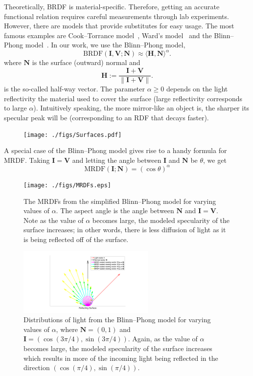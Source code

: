 \documentclass[11pt,reqno]{amsart}
\newcommand{\BRDF}{\mathrm{BRDF}}
\newcommand{\MRDF}{\mathrm{MRDF}}
\newcommand{\ip}[2]{\langle {#1}, {#2} \rangle}
\theoremstyle{definition}
\begin{document}
Theoretically, BRDF is material-specific. Therefore, getting an accurate functional
relation requires careful measurements through lab experiments. However, there
are models that provide substitutes for easy usage. The most famous examples
are Cook--Torrance model~\cite{CookTorr}, Ward's model~\cite{Ward} and the
Blinn--Phong model~\cite{BlinnPhong}. In our 
work, we use the
Blinn--Phong model,
\[
   \BRDF(\mathbf{I},\mathbf{V};\mathbf{N})
   \approx
   \ip{\mathbf{H}}{\mathbf{N}}^\alpha.
\]
where $\mathbf{N}$ is the surface (outward) normal and 
$$\mathbf{H}:=\frac{\mathbf{I}+\mathbf{V}} {\|\mathbf{I}+\mathbf{V}\|}.$$
is the so-called half-way vector. The parameter $\alpha \geq 0$ depends on the
light reflectivity the material used to cover the surface (large reflectivity
corresponds to large $\alpha$). Intuitively speaking, the more mirror-like an
object is,  the sharper its specular peak will be (corresponding to an RDF that
decays faster). 

\begin{figure}
 \texttt{[image: ./figs/Surfaces.pdf]}
\end{figure}

A special case of the Blinn--Phong model gives rise to a handy formula for MRDF. Taking $\mathbf{I}=\mathbf{V}$ and letting the angle between $\mathbf{I}$ and $\mathbf{N}$ be $\theta$, we get
\[
\MRDF(\mathbf{I};\mathbf{N})=(\cos \theta)^\alpha
\]

\begin{figure}
 \texttt{[image: ./figs/MRDFs.eps]}
 \caption{The MRDFs from the simplified Blinn--Phong model for varying values of $\alpha$. The aspect angle is the angle between $\mathbf{N}$ and $\mathbf{I}=\mathbf{V}$. Note as the value of $\alpha$ becomes large, the modeled specularity of the surface increases; in other words, there is less diffusion of light as it is being reflected off of the surface.}
 \label{MRDFs}
\end{figure}

\begin{figure}
 \includegraphics[width=0.6\textwidth]{./figs/BRDF_Vectors.pdf}
 \caption{Distributions of light from the Blinn--Phong model for varying values of $\alpha$, where $\mathbf{N} = (0,1)$ and $\mathbf{I} = (\cos(3\pi/4),\sin(3\pi/4))$. Again, as the value of $\alpha$ becomes large, the modeled specularity of the surface increases which results in more of the incoming light being reflected in the direction $(\cos(\pi/4),\sin(\pi/4))$.}
 \label{BRDFVectors}
\end{figure}
\end{document}
